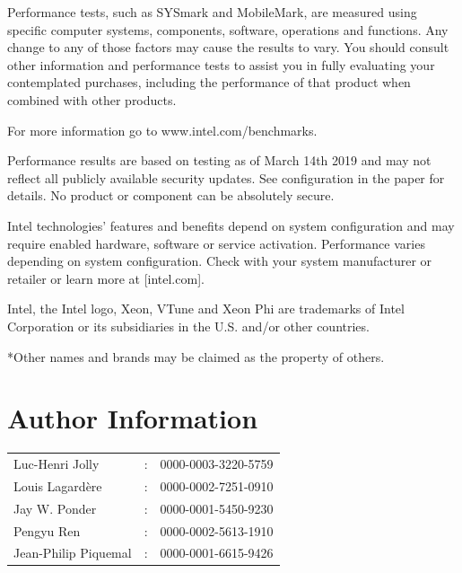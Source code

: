 \documentclass[9pt,comparison]{livecoms}
\begin{document}
Performance tests, such as SYSmark and MobileMark, are measured using specific computer systems, components, software, operations and functions. Any change to any of those factors may cause the results to vary. You should consult other information and performance tests to assist you in fully evaluating your contemplated purchases, including the performance of that product when combined with other products.

For more information go to www.intel.com/benchmarks.

Performance results are based on testing as of March 14th 2019 and may not reflect all publicly available security updates.  See configuration in the paper for details.  No product or component can be absolutely secure.

Intel technologies’ features and benefits depend on system configuration and may require enabled hardware, software or service activation. Performance varies depending on system configuration. Check with your system manufacturer or retailer or learn more at [intel.com].

Intel, the Intel logo, Xeon, VTune and Xeon Phi are trademarks of Intel Corporation or its subsidiaries in the U.S. and/or other countries.

*Other names and brands may be claimed as the property of others. 

\section*{Author Information}
\makeorcid
\begin{tabular}{lcl}
 Luc-Henri Jolly &:& 0000-0003-3220-5759 \\
 Louis Lagardère &:& 0000-0002-7251-0910\\
 Jay W. Ponder& :  & 0000-0001-5450-9230\\
 Pengyu Ren &: &0000-0002-5613-1910\\
 Jean-Philip Piquemal&:& 0000-0001-6615-9426\\
 \end{tabular}




\onecolumn
\listoffigures
\listoftables
\lstlistoflistings
\end{document}
